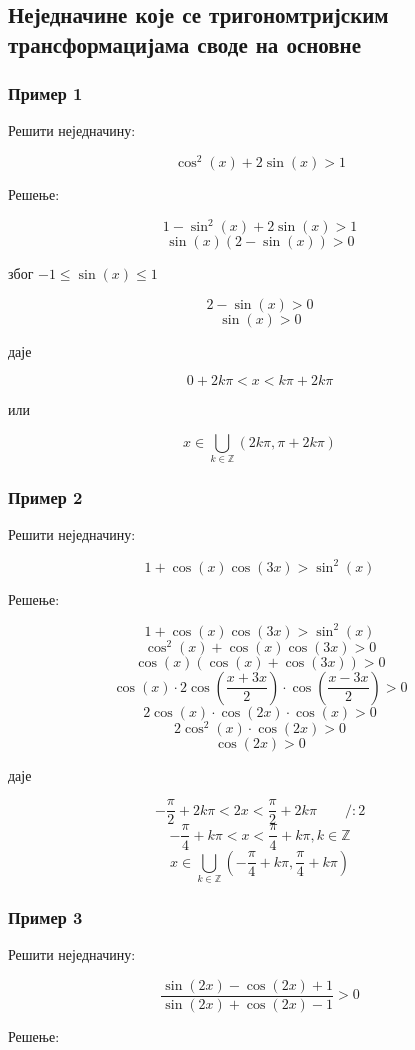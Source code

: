 \documentclass[a4paper,12pt]{article}
\begin{document}
\subsection{Неједначине које се тригономтријским трансформацијама своде на основне}

\subsubsection{Пример 1}

Решити неједначину:

\[\cos^{2}(x)+2\sin(x)>1\]

Решење:

\[1-\sin^{2}(x)+2\sin(x)>1\]
\[\sin(x)(2-\sin(x))>0\]
\centerline{због $-1\le\sin(x)\le1$}
\[2-\sin(x)>0\]
\[\sin(x)>0\]
\centerline{даје}
\[0+2k\pi<x<k\pi+2k\pi\]
\centerline{или}
\[x\in\bigcup_{k\in\mathbb{Z}}(2k\pi,\pi+2k\pi)\]

\subsubsection{Пример 2}

Решити неједначину:

\[1+\cos(x)\cos(3x)>\sin^{2}(x)\]

Решење:

\[1+\cos(x)\cos(3x)>\sin^{2}(x)\]
\[\cos^{2}(x)+\cos(x)\cos(3x)>0\]
\[\cos(x)(\cos(x)+\cos(3x))>0\]
\[\cos(x)\cdot2\cos\left(\frac{x+3x}{2}\right)\cdot\cos\left(\frac{x-3x}{2}\right)>0\]
\[2\cos(x)\cdot\cos(2x)\cdot\cos(x)>0\]
\[2\cos^{2}(x)\cdot\cos(2x)>0\]
\[\cos(2x)>0\]
\centerline{даје}
\[-\frac{\pi}{2}+2k\pi<2x<\frac{\pi}{2}+2k\pi\qquad/:2\]
\[-\frac{\pi}{4}+k\pi<x<\frac{\pi}{4}+k\pi,k\in\mathbb{Z}\]
\[x\in\bigcup_{k\in\mathbb{Z}}\left(-\frac{\pi}{4}+k\pi,\frac{\pi}{4}+k\pi\right)\]


\subsubsection{Пример 3}

Решити неједначину:

\[\frac{\sin(2x)-\cos(2x)+1}{\sin(2x)+\cos(2x)-1}>0\]

Решење:
\end{document}
